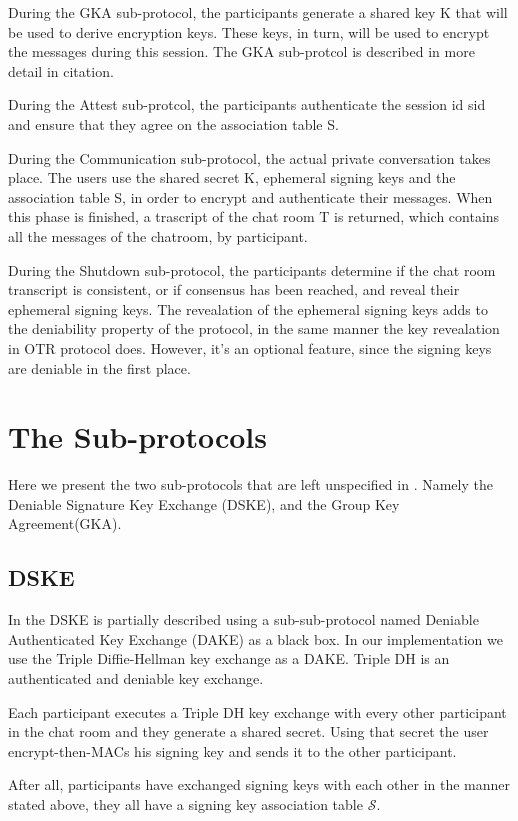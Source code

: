 \documentclass[]{article}
\begin{document}
During the GKA sub-protocol, the participants generate a shared key K that will be used to derive encryption keys.
These keys, in turn, will be used to encrypt the messages during this session.
The GKA sub-protcol is described in more detail in {citation}.

During the Attest sub-protcol, the participants authenticate the session id sid and ensure that they agree on the association table S.

During the Communication sub-protocol, the actual private conversation takes place.
The users use the shared secret K, ephemeral signing keys and the association table S, in order to encrypt and authenticate their messages.
When this phase is finished, a trascript of the chat room T is returned, which contains all the messages of the chatroom, by participant.

During the Shutdown sub-protocol, the participants determine if the chat room transcript is consistent, or if consensus has been reached, and reveal their ephemeral signing keys.
The revealation of the ephemeral signing keys adds to the deniability property of the protocol, in the same manner the key revealation in OTR protocol does.
However, it's an optional feature, since the signing keys are deniable in the first place.

\section{The Sub-protocols}

Here we present the two sub-protocols that are left unspecified in \cite{mpotr}.
Namely the Deniable Signature Key Exchange (DSKE), and the Group Key Agreement(GKA).

\subsection{DSKE}

In \cite{mpotr} the DSKE is partially described using a sub-sub-protocol named Deniable Authenticated Key Exchange (DAKE) as a black box.
In our implementation we use the Triple Diffie-Hellman key exchange as a DAKE.
Triple DH is an authenticated and deniable key exchange.

Each participant executes a Triple DH key exchange with every other participant in the chat room and they generate a shared secret.
Using that secret the user encrypt-then-MACs his signing key and sends it to the other participant.

After all, participants have exchanged signing keys with each other in the manner stated above, they all have a signing key association table $\mathcal{S}$.
\end{document}
